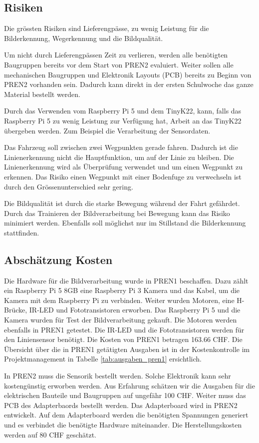 \documentclass[../main.tex]{subfiles}
\begin{document}
\newpage
\subsection{Risiken}
Die grössten Risiken sind Lieferengpässe, zu wenig Leistung für die Bilderkennung, Wegerkennung und die Bildqualität. 

Um nicht durch Lieferengpässen Zeit zu verlieren, werden alle benötigten Baugruppen bereits vor dem Start von PREN2 evaluiert. Weiter sollen alle mechanischen Baugruppen und Elektronik Layouts (PCB) bereits zu Beginn von PREN2 vorhanden sein. Dadurch kann direkt in der ersten Schulwoche das ganze Material bestellt werden.

Durch das Verwenden vom Raspberry Pi 5 und dem TinyK22, kann, falls das Raspberry Pi 5 zu wenig Leistung zur Verfügung hat, Arbeit an das TinyK22 übergeben werden. Zum Beispiel die Verarbeitung der Sensordaten. 

Das Fahrzeug soll zwischen zwei Wegpunkten gerade fahren. Dadurch ist die Linienerkennung nicht die Hauptfunktion, um auf der Linie zu bleiben. Die Linienerkennung wird als Überprüfung verwendet und um einen Wegpunkt zu erkennen. Das Risiko einen Wegpunkt mit einer Bodenfuge zu verwechseln ist durch den Grössenunterschied sehr gering. 

Die Bildqualität ist durch die starke Bewegung während der Fahrt gefährdet. Durch das Trainieren der Bildverarbeitung bei Bewegung kann das Risiko minimiert werden. Ebenfalls soll möglichst nur im Stillstand die Bilderkennung stattfinden. 

\subsection{Abschätzung Kosten}
Die Hardware für die Bildverarbeitung wurde in PREN1 beschaffen. Dazu zählt ein Raspberry Pi 5 8GB eine Raspberry Pi 3 Kamera und das Kabel, um die Kamera mit dem Raspberry Pi zu verbinden. Weiter wurden Motoren, eine H-Brücke, IR-LED und Fototransistoren erworben. Das Raspberry Pi 5 und die Kamera wurden für Test der Bildverarbeitung gekauft. Die Motoren werden ebenfalls in PREN1 getestet. Die IR-LED und die Fototransistoren werden für den Liniensensor benötigt. Die Kosten von PREN1 betragen 163.66 CHF. Die Übersicht über die in PREN1 getätigten Ausgaben ist in der Kostenkontrolle im Projektmanagement in Tabelle \ref{tab:ausgaben_pren1} ersichtlich. 

In PREN2 muss die Sensorik bestellt werden. Solche Elektronik kann sehr kostengünstig erworben werden. Aus Erfahrung schätzen wir die Ausgaben für die elektrischen Bauteile und Baugruppen auf ungefähr 100 CHF. Weiter muss das PCB des Adapterbaords bestellt werden. Das Adapterboard wird in PREN2 entwickelt. Auf dem Adapterboard werden die benötigten Spannungen generiert und es verbindet die benötigte Hardware miteinander. Die Herstellungskosten werden auf 80 CHF geschätzt.
\end{document}
